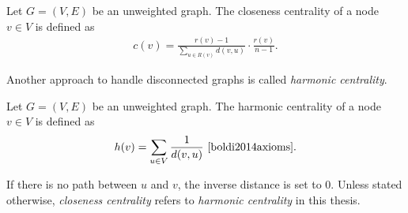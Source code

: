 \begin{definition}
\label{def:closenessGeneral}
Let $G = (V, E)$ be an unweighted graph. The closeness centrality of a node $v \in V$ is defined as
\begin{align*}
	c(v) = \frac{r(v) - 1}{\sum_{u \in R(v)}{d(v, u)}} \cdot \frac{r(v)}{n - 1}.
\end{align*}
\end{definition}

Another approach to handle disconnected graphs is called \emph{harmonic centrality}.

\begin{definition}
\label{def:harmonicCentrality}
Let $G = (V, E)$ be an unweighted graph. The harmonic centrality of a node $v \in V$ is defined as
\begin{align*}
	h(v) = \sum_{u \in V}{\frac{1}{d(v, u)}}\text{~\cite{boldi2014axioms}}.
\end{align*}
\end{definition}
If there is no path between $u$ and $v$, the inverse distance is set to $0$. Unless stated otherwise, \emph{closeness centrality} refers to \emph{harmonic centrality} in this thesis.